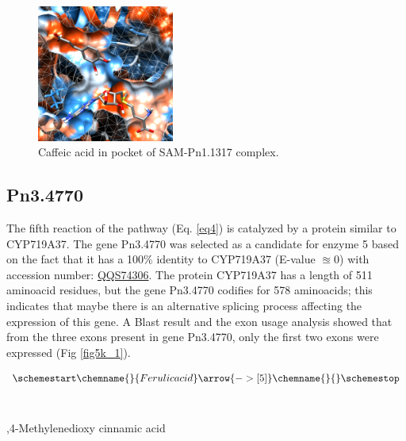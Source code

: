 \documentclass[12pt]{article}
\begin{document}
	\FloatBarrier
	
	\FloatBarrier
	\begin{figure}[h!]
		\centering
		\includegraphics[width=0.4\textwidth]{../4/Dock/Dock2/chimera.png}
		\caption{Caffeic acid in pocket of SAM-Pn1.1317 complex.}
		\label{fig4_10}
	\end{figure}
	\FloatBarrier
	
	\newpage
	
	\subsection{Pn3.4770}
	
	The fifth reaction of the pathway (Eq. \ref{eq4}) is catalyzed by a protein similar to CYP719A37. The gene Pn3.4770 was selected as a candidate for enzyme 5 based on the fact that it has a 100\% identity to CYP719A37 (E-value $\approxeq 0$) with accession number: \href{https://www.ncbi.nlm.nih.gov/protein/QQS74306.1/}{QQS74306}. The protein CYP719A37 has a length of 511 aminoacid residues, but the gene Pn3.4770 codifies for 578 aminoacids; this indicates that maybe there is an alternative splicing process affecting the expression of this gene. A Blast result and the exon usage analysis showed that from the three exons present in gene Pn3.4770, only the first two exons were expressed (Fig \ref{fig5k_1}).
	
	\begin{equation}
	\schemestart
	\chemname{\footnotesize}{Ferulic acid}\arrow{->[ 5]}\chemname{\footnotesize}{\vspace{-100pt}}
	\label{eq4}
	\schemestop
	\end{equation}\\
	
	\vspace{-50pt}\hspace{0.5\paperwidth-20pt}
	\begin{minipage}{0.3\paperwidth}
		,4-Methylenedioxy cinnamic acid
	\end{minipage}\\
	
\end{document}
